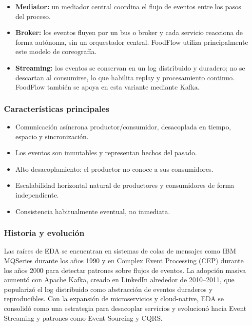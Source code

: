 \documentclass[12pt,a4paper]{article}
\begin{document}
\begin{itemize}[leftmargin=*]
    \item \textbf{Mediator:} un mediador central coordina el flujo de eventos entre los pasos del proceso.
    \item \textbf{Broker:} los eventos fluyen por un bus o broker y cada servicio reacciona de forma autónoma, sin un orquestador central. FoodFlow utiliza principalmente este modelo de coreografía.
    \item \textbf{Streaming:} los eventos se conservan en un log distribuido y duradero; no se descartan al consumirse, lo que habilita replay y procesamiento continuo. FoodFlow también se apoya en esta variante mediante Kafka.
\end{itemize}

\subsubsection{Características principales}

\begin{itemize}[leftmargin=*]
    \item Comunicación asíncrona productor/consumidor, desacoplada en tiempo, espacio y sincronización.
    \item Los eventos son inmutables y representan hechos del pasado.
    \item Alto desacoplamiento: el productor no conoce a sus consumidores.
    \item Escalabilidad horizontal natural de productores y consumidores de forma independiente.
    \item Consistencia habitualmente eventual, no inmediata.
\end{itemize}

\subsubsection{Historia y evolución}

Las raíces de EDA se encuentran en sistemas de colas de mensajes como IBM MQSeries durante los años 1990 y en Complex Event Processing (CEP) durante los años 2000 para detectar patrones sobre flujos de eventos. La adopción masiva aumentó con Apache Kafka, creado en LinkedIn alrededor de 2010--2011, que popularizó el log distribuido como abstracción de eventos duraderos y reproducibles. Con la expansión de microservicios y cloud-native, EDA se consolidó como una estrategia para desacoplar servicios y evolucionó hacia Event Streaming y patrones como Event Sourcing y CQRS.
\end{document}
